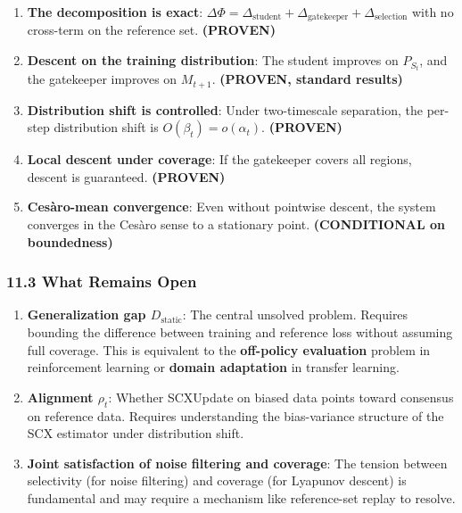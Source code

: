\documentclass[
  12pt,
]{article}
\begin{document}
\begin{enumerate}
\def\labelenumi{\arabic{enumi}.}
\item
  \textbf{The decomposition is exact}:
  \(\Delta\Phi = \Delta_{\text{student}} + \Delta_{\text{gatekeeper}} + \Delta_{\text{selection}}\)
  with no cross-term on the reference set. \textbf{(PROVEN)}
\item
  \textbf{Descent on the training distribution}: The student improves on
  \(P_{S_t}\), and the gatekeeper improves on \(M_{t+1}\).
  \textbf{(PROVEN, standard results)}
\item
  \textbf{Distribution shift is controlled}: Under two-timescale
  separation, the per-step distribution shift is
  \(O(\beta_t) = o(\alpha_t)\). \textbf{(PROVEN)}
\item
  \textbf{Local descent under coverage}: If the gatekeeper covers all
  regions, descent is guaranteed. \textbf{(PROVEN)}
\item
  \textbf{Cesàro-mean convergence}: Even without pointwise descent, the
  system converges in the Cesàro sense to a stationary point.
  \textbf{(CONDITIONAL on boundedness)}
\end{enumerate}

\subsubsection{11.3 What Remains Open}\label{what-remains-open}

\begin{enumerate}
\def\labelenumi{\arabic{enumi}.}
\item
  \textbf{Generalization gap \(D_{\text{static}}\)}: The central
  unsolved problem. Requires bounding the difference between training
  and reference loss without assuming full coverage. This is equivalent
  to the \textbf{off-policy evaluation} problem in reinforcement
  learning or \textbf{domain adaptation} in transfer learning.
\item
  \textbf{Alignment \(\rho_t\)}: Whether SCXUpdate on biased data points
  toward consensus on reference data. Requires understanding the
  bias-variance structure of the SCX estimator under distribution shift.
\item
  \textbf{Joint satisfaction of noise filtering and coverage}: The
  tension between selectivity (for noise filtering) and coverage (for
  Lyapunov descent) is fundamental and may require a mechanism like
  reference-set replay to resolve.
\end{enumerate}
\end{document}
